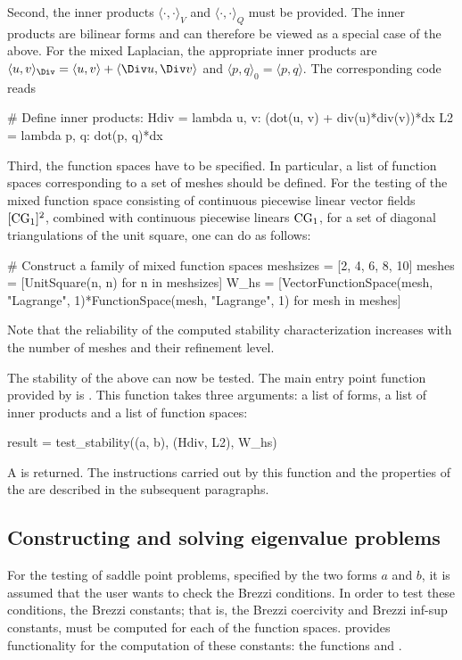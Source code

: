 Second, the inner products $\langle \cdot, \cdot \rangle_V$ and
$\langle \cdot, \cdot \rangle_Q$ must be provided. The inner products
are bilinear forms and can therefore be viewed as a special case of
the above. For the mixed Laplacian, the appropriate inner products are
$\langle u, v \rangle_{\Div} = \langle u, v \rangle + \langle \Div u,
\Div v \rangle$ and $\langle p, q \rangle_0 = \langle p, q \rangle$. The
corresponding code reads
\begin{python}
# Define inner products:
Hdiv = lambda u, v: (dot(u, v) + div(u)*div(v))*dx
L2 = lambda p, q: dot(p, q)*dx
\end{python}

Third, the function spaces have to be specified. In particular, a list
of function spaces corresponding to a set of meshes should be defined.
For the testing of the mixed function space consisting of continuous
piecewise linear vector fields $[\mathrm{CG}_{1}]^{2}$, combined with
continuous piecewise linears $\mathrm{CG}_{1}$, for a set of diagonal
triangulations of the unit square, one can do as follows:
\begin{python}
# Construct a family of mixed function spaces
meshsizes = [2, 4, 6, 8, 10]
meshes = [UnitSquare(n, n) for n in meshsizes]
W_hs = [VectorFunctionSpace(mesh, "Lagrange", 1)*FunctionSpace(mesh, "Lagrange", 1)
        for mesh in meshes]
\end{python}
Note that the reliability of the computed stability characterization
increases with the number of meshes and their refinement level.

The stability of the above can now be tested. The main entry point
function provided by \rognesascot{} is . This
function takes three arguments: a list of forms, a list of inner
products and a list of function spaces:
\begin{python}
result = test_stability((a, b), (Hdiv, L2), W_hs)
\end{python}
A  is returned.  The instructions carried out by
this function and the properties of the  are
described in the subsequent paragraphs.

\subsection{Constructing and solving eigenvalue problems}

For the testing of saddle point problems, specified by the two forms
$a$ and $b$, it is assumed that the user wants to check the Brezzi
conditions. In order to test these conditions, the Brezzi constants;
that is, the Brezzi coercivity and Brezzi inf-sup constants, must be
computed for each of the function spaces. \rognesascot{} provides
functionality for the computation of these constants: the functions
 and
.

